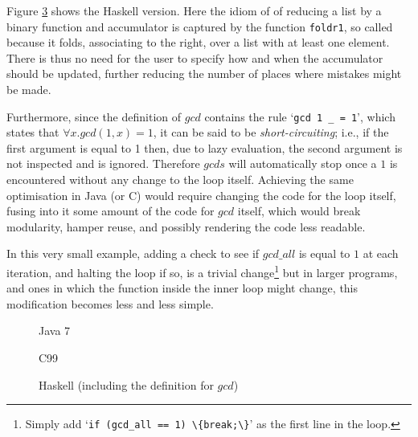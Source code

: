 Figure \ref{fig:gcds:haskell} shows the Haskell version. Here the idiom
of of reducing a list by a binary function and accumulator is captured
by the function \lstinline|foldr1|, so called because it folds,
associating to the right, over a list with at least one element. There is thus no 
need for the user to specify how and when the accumulator should be updated,
further reducing the number of places where mistakes might be made.

Furthermore, since the definition of $gcd$ contains the rule
`\lstinline|gcd 1 _ = 1|',
which states that $\forall x. gcd (1, x) = 1$, it can be said to be
\emph{short-circuiting}; i.e., if the first argument is equal to 1 then, due
to lazy evaluation, the second argument is not inspected and is ignored.
Therefore $gcds$ will automatically stop once a $1$ is encountered without any
change to the loop itself. Achieving the same optimisation in Java (or C) would
require changing the code for the loop itself, fusing into it some amount of the code
for $gcd$ itself, which would break
modularity, hamper reuse, and possibly rendering the code less readable.

In this very small example, adding a check to see if $gcd\_all$ is equal to $1$ at each 
iteration, and halting the loop if so, is a trivial change\footnote{Simply add `\lstinline|if (gcd_all == 1) \{break;\}|' as the first line in the loop.}
but in larger programs, and ones in which the function inside the inner loop might change,
this modification becomes less and less simple.

\begin{figure}

\caption{Java 7}
\label{fig:gcds:java}
\end{figure}

\begin{figure}

\caption{C99}
\label{fig:gcds:c}
\end{figure}

\begin{figure}

\caption{Haskell (including the definition for $gcd$)}
\label{fig:gcds:haskell}
\end{figure}
